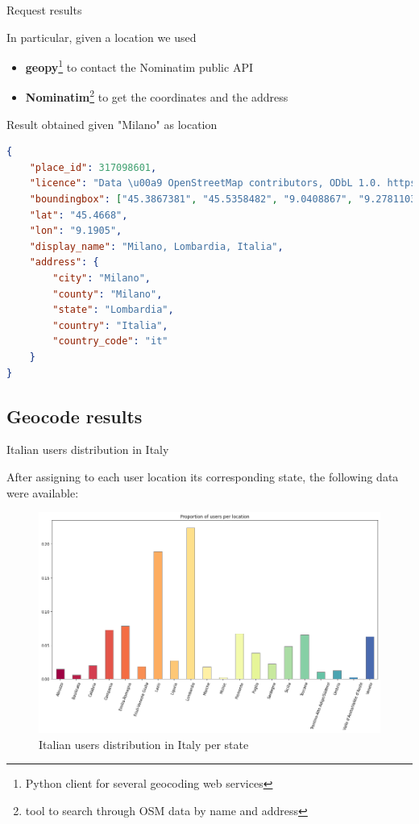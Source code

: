 \documentclass[8pt]{beamer}  %
\begin{document}
\begin{frame}[fragile]{Request results}

    In particular, given a location we used
    
    \begin{itemize}
        \item \textbf{geopy}\footnote{Python client for several geocoding web services} to contact the Nominatim public API 
        \item \textbf{Nominatim}\footnote{tool to search through OSM data by name and address} to get the coordinates and the address
    \end{itemize}
    
    \begin{block}{Result obtained given "Milano" as location}
    	\begin{lstlisting}[language=json]
{
    "place_id": 317098601, 
    "licence": "Data \u00a9 OpenStreetMap contributors, ODbL 1.0. https://osm.org/copyright",
    "boundingbox": ["45.3867381", "45.5358482", "9.0408867", "9.2781103"], 
    "lat": "45.4668", 
    "lon": "9.1905", 
    "display_name": "Milano, Lombardia, Italia",
    "address": {
        "city": "Milano", 
        "county": "Milano",
        "state": "Lombardia", 
        "country": "Italia", 
        "country_code": "it"
    }
}
        \end{lstlisting}
	\end{block}
    
\end{frame}

\subsection{Geocode results}

\begin{frame}{Italian users distribution in Italy}

    After assigning to each user location its corresponding state, the following data were available:
    
    \begin{figure}
        \centering
        \includegraphics[scale=0.3]{assets/img/it_user_distribution.png}
        \caption{Italian users distribution in Italy per state}
        \label{fig:it_user_distribution}
    \end{figure}
    
\end{frame}
\end{document}
